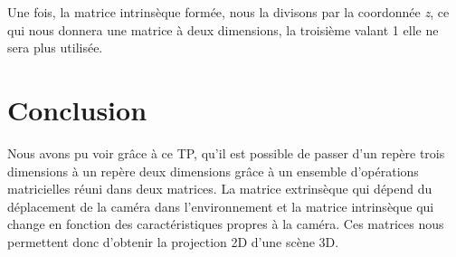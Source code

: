 \documentclass[a4paper,11pt]{article}
\begin{document}
  Une fois, la matrice intrinsèque formée, nous la divisons par la coordonnée \textit{z},
  ce qui nous donnera une matrice à deux dimensions, la troisième valant 1 elle ne sera
  plus utilisée.
     
  
  
  \section*{Conclusion}
  Nous avons pu voir grâce à ce TP, qu'il est possible de passer d'un repère trois dimensions à un repère deux
  dimensions grâce à un ensemble d'opérations matricielles réuni dans deux matrices. La matrice extrinsèque
  qui dépend du déplacement de la caméra dans l'environnement et la matrice intrinsèque qui change en fonction 
  des caractéristiques propres à la caméra. Ces matrices nous permettent donc d'obtenir la projection 2D 
  d'une scène 3D.
    
\end{document}

